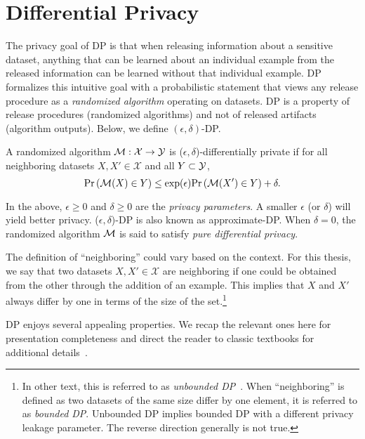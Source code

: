 \section{Differential Privacy}
The privacy goal of DP is that when releasing information about a sensitive dataset, anything that can be learned about an individual example from the released information can be learned without that individual example.
DP formalizes this intuitive goal with a probabilistic statement that views any release procedure as a \emph{randomized algorithm} operating on datasets.
DP is a property of release procedures (randomized algorithms) and not of released artifacts (algorithm outputs).
Below, we define $(\epsilon, \delta)$-DP.
\begin{defi}
A randomized algorithm $\mathcal{M}: \mathcal{X} \to \mathcal{Y}$ is ($\epsilon, \delta$)-differentially private if for all neighboring datasets $X, X'\in\mathcal{X}$ and all $Y \subset \mathcal{Y}$, 
$$
\mathrm{Pr}\left(\mathcal{M}(X) \in Y\right) \le \exp( \epsilon ) \mathrm{Pr}\left( \mathcal{M}(X') \in Y \right) + \delta.
\label{eq:epsilon_delta_dp}
$$
\end{defi}
In the above, $\epsilon \ge 0$ and $\delta \ge 0$ are the \emph{privacy parameters}.
A smaller $\epsilon$ (or $\delta$) will yield better privacy.
($\epsilon, \delta$)-DP is also known as approximate-DP.
When $\delta=0$, the randomized algorithm $\mathcal{M}$ is said to satisfy \emph{pure differential privacy}.

The definition of ``neighboring'' could vary based on the context. 
For this thesis, we say that two datasets $X, X' \in \mathcal{X}$ are neighboring if one could be obtained from the other through the addition of an example. 
This implies that $X$ and $X'$ always differ by one in terms of the size of the set.\footnote{
In other text, this is referred to as \emph{unbounded DP}~\cite{kifer2011no}. When ``neighboring'' is defined as two datasets of the same size differ by one element, it is referred to as \emph{bounded DP}.
Unbounded DP implies bounded DP with a different privacy leakage parameter.
The reverse direction generally is not true.
}

DP enjoys several appealing properties. 
We recap the relevant ones here for presentation completeness and direct the reader to classic textbooks for additional details~\cite{dwork2014algorithmic,vadhan2017complexity}.

